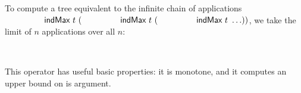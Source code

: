 To compute
a tree equivalent to the infinite
chain of applications $\indMax\ t\ (\indMax\ t\ (\indMax\ t\ \ldots))$,
we take the limit of $n$ applications over all $n$:
\begin{code}%
%
\>[4]\AgdaSpace{}%
\AgdaSymbol{:}\AgdaSpace{}%
\AgdaSpace{}%
\AgdaSpace{}%
\<%
\\
%
\>[4]\AgdaSpace{}%
\AgdaSpace{}%
\AgdaSymbol{=}%
\>[17]\AgdaSpace{}%
\AgdaSpace{}%
\AgdaSpace{}%
\AgdaSpace{}%
\AgdaSpace{}%
\AgdaSpace{}%
\AgdaSymbol{)}\<%
\end{code}

This operator has useful basic properties: it is monotone, and it computes
an upper bound on is argument.

\begin{code}%
%
\>[4]\AgdaSpace{}%
\AgdaSymbol{:}\AgdaSpace{}%
\AgdaSpace{}%
\AgdaSpace{}%
\AgdaSpace{}%
\AgdaSpace{}%
\AgdaSpace{}%
\AgdaSpace{}%
\<%
\\
%
\\[\AgdaEmptyExtraSkip]%
%
\>[4]\AgdaSpace{}%
\AgdaSymbol{:}\AgdaSpace{}%
\AgdaSpace{}%
\AgdaSymbol{\{}\AgdaSpace{}%
\AgdaSymbol{\}}\<%
\\
\>[4][@{}l@{\AgdaIndent{0}}]%
\>[6]\AgdaSpace{}%
\AgdaSpace{}%
\AgdaSpace{}%
\<%
\\
%
\>[6]\AgdaSpace{}%
\AgdaSymbol{(}\AgdaSpace{}%
\AgdaSymbol{)}\AgdaSpace{}%
\AgdaSpace{}%
\AgdaSymbol{(}\AgdaSpace{}%
\AgdaSymbol{)}\<%
\end{code}

